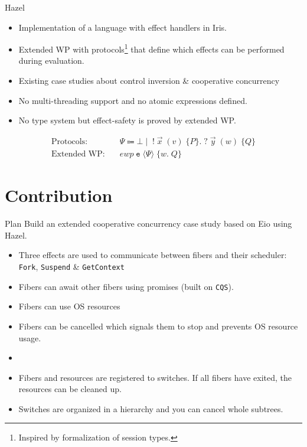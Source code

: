 \documentclass[aspectratio=43]{beamer}
\newcommand{\ocaml}[1]{\texttt{#1}}
\newcommand{\ewp}[3]{\textit{ewp}\; #1\; \langle #2 \rangle\; \{#3\}}
\begin{document}
\begin{frame}{Hazel}
    \begin{itemize}
        \item Implementation of a language with effect handlers in Iris.
        \item Extended WP with protocols\footnote{Inspired by formalization of session types.} that define which effects can be performed during evaluation.
        \item Existing case studies about control inversion \& cooperative concurrency
        \item No multi-threading support and no atomic expressions defined.
        \item No type system but effect-safety is proved by extended WP.
    \end{itemize}
    \begin{align*}
        \text{Protocols:}   & \quad \Psi \Coloneqq \bot \mid\; !\; \vec{x}\; (v)\; \{ P \}.\; ?\; \vec{y}\; (w)\; \{ Q \} \\
        \text{Extended WP:} & \quad \ewp{\texttt{e}}{\Psi}{w.\; Q}
    \end{align*}
\end{frame}

\section{Contribution}

\begin{frame}{Plan}
    Build an extended cooperative concurrency case study based on Eio using Hazel.
    \begin{itemize}
        \item Three effects are used to communicate between fibers and their scheduler: \ocaml{Fork}, \ocaml{Suspend} \& \ocaml{GetContext}
        \item Fibers can await other fibers using promises (built on \ocaml{CQS}).
        \item Fibers can use OS resources
        \item Fibers can be cancelled which signals them to stop and prevents OS resource usage.
        \item[]
        \item Fibers and resources are registered to switches. If all fibers have exited, the resources can be cleaned up.
        \item Switches are organized in a hierarchy and you can cancel whole subtrees.
    \end{itemize}
\end{frame}
\end{document}
